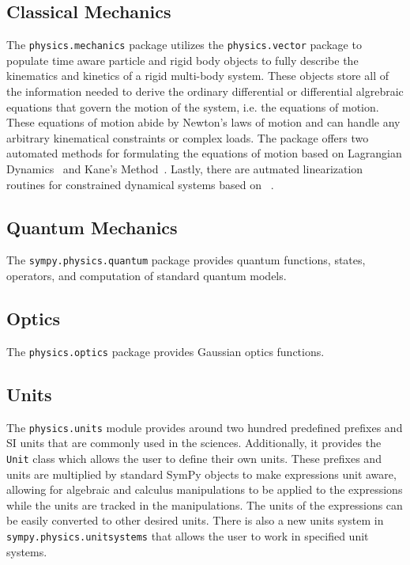 \subsection{Classical Mechanics}

The \verb|physics.mechanics| package utilizes the \verb|physics.vector| package
to populate time aware particle and rigid body objects to fully describe the
kinematics and kinetics of a rigid multi-body system. These objects store all
of the information needed to derive the ordinary differential or differential
algrebraic equations that govern the motion of the system, i.e. the equations
of motion. These equations of motion abide by Newton's laws of motion and can
handle any arbitrary kinematical constraints or complex loads. The package
offers two automated methods for formulating the equations of motion based on
Lagrangian Dynamics~\cite{Lagrange1811} and Kane's Method~\cite{Kane1985}. Lastly, there
are autmated linearization routines for constrained dynamical
systems based on ~\cite{Peterson2014}.

\subsection{Quantum Mechanics}

The \verb|sympy.physics.quantum| package provides quantum functions, states,
operators, and computation of standard quantum models.


\subsection{Optics}

The \verb|physics.optics| package provides Gaussian optics functions.


\subsection{Units}

The \verb|physics.units| module provides around two hundred predefined prefixes
and SI units that are commonly used in the sciences. Additionally, it provides
the \verb|Unit| class which allows the user to define their own units.  These
prefixes and units are multiplied by standard SymPy objects to make expressions
unit aware, allowing for algebraic and calculus manipulations to be applied to
the expressions while the units are tracked in the manipulations.  The units of
the expressions can be easily converted to other desired units.  There is also
a new units system in \verb|sympy.physics.unitsystems| that allows the user to
work in specified unit systems.
